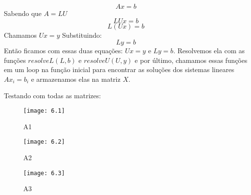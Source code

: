 \documentclass[leqno]{article}
\numberwithin{equation}{section}
\begin{document}
\begin{enumerate}
\begin{sol}
$$Ax = b$$
Sabendo que $A = LU$
$$LUx = b$$
$$L(Ux) = b$$
Chamamos $Ux = y$
Substituindo:
$$Ly = b$$
Então ficamos com essas duas equações: $Ux = y$ e $Ly = b$. Resolvemos ela com as funções $resolveL(L,b)$ e $resolveU(U,y)$ e por último, chamamos essas funções em um loop na função inicial para encontrar as soluções dos sistemas lineares $Ax_i = b_i$ e armazenamos elas na matriz $X$.

Testando com todas as matrizes:
\begin{figure}[H]
	\centering
	\texttt{[image: 6.1]}
	\caption{A1}
	\label{fig:6}
\end{figure}

\begin{figure}[H]
	\centering
	\texttt{[image: 6.2]}
	\caption{A2}
	\label{fig:7}
\end{figure}

\begin{figure}[H]
	\centering
	\texttt{[image: 6.3]}
	\caption{A3}
	\label{fig:8}
\end{figure}

\end{sol}


\end{enumerate}
\end{document}
